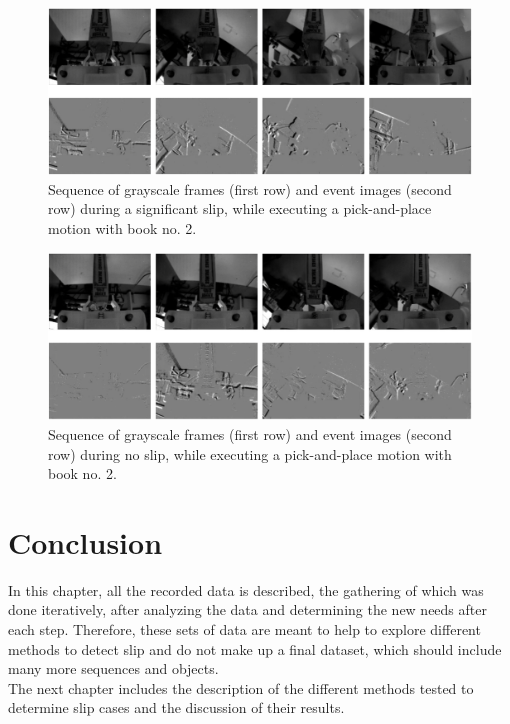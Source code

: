 \begin{figure}[H]
    \centering
    \includegraphics[width=\textwidth]{resources/images/set3_case3}
    \caption{Sequence of grayscale frames (first row) and event images (second row) during a significant slip, while executing a pick-and-place motion with book no. 2.}\label{fig:set3_case3}
\end{figure}

\begin{figure}[H]
    \centering
    \includegraphics[width=\textwidth]{resources/images/set3_case4}
    \caption{Sequence of grayscale frames (first row) and event images (second row) during no slip, while executing a pick-and-place motion with book no. 2.}\label{fig:set3_case4}
\end{figure}

\section{Conclusion}

In this chapter, all the recorded data is described, the gathering of which was done iteratively, after analyzing the data and determining the new needs after each step. Therefore, these sets of data are meant to help to explore different methods to detect slip and do not make up a final dataset, which should include many more sequences and objects.\\

The next chapter includes the description of the different methods tested to determine slip cases and the discussion of their results.



